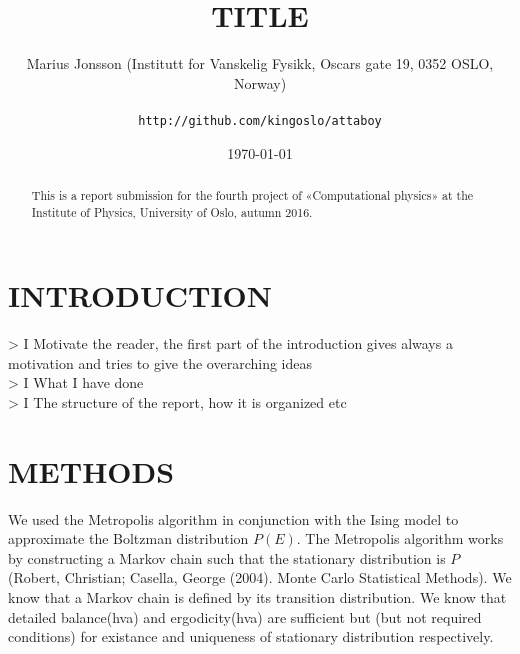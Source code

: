 \documentclass[11pt,english,a4paper]{article}
\author{\normalsize Marius Jonsson (Institutt for Vanskelig Fysikk, Oscars gate 19, 0352 OSLO, Norway) \\\\
\vspace{5px}
\normalsize \texttt{http://github.com/kingoslo/attaboy}}
\title{\bf \uppercase{TiTlE}}
\date{\normalsize \today}
\begin{document}
\maketitle
\begin{abstract} \normalsize This is a report submission for the fourth project of «Computational physics» at the Institute of Physics, University of Oslo, autumn 2016.
\end{abstract}
\lstset{
  xleftmargin=.2\textwidth, xrightmargin=.2\textwidth
}



\section*{\uppercase{Introduction}}
> I Motivate the reader, the first part of the introduction gives always a motivation and tries to give the overarching ideas\\
> I What I have done\\
> I The structure of the report, how it is organized etc
\section*{\uppercase{Methods}}
We used the Metropolis algorithm in conjunction with the Ising model to approximate the Boltzman distribution $P(E)$. The Metropolis algorithm works by constructing a Markov chain such that the stationary distribution is $P$ (Robert, Christian; Casella, George (2004). Monte Carlo Statistical Methods). We know that a Markov chain is defined by its transition distribution. We know that detailed balance(hva) and ergodicity(hva) are sufficient but (but not required conditions) for existance and uniqueness of stationary distribution respectively.
\end{document}
